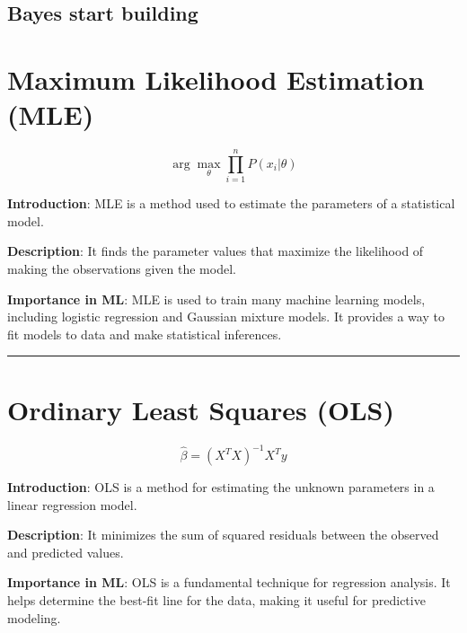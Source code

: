 \documentclass[
  12 pt,
  a4paper,
]{book}
\numberwithin{equation}{section}
\theoremstyle{plain}      %
\theoremstyle{definition} %
\theoremstyle{remark}     %
\theoremstyle{note}         %
\begin{document}
\hypertarget{bayes-start-building}{%
\section{Bayes start building}\label{bayes-start-building}}


\hypertarget{maximum-likelihood-estimation-mle}{%
\chapter{Maximum Likelihood Estimation
(MLE)}\label{maximum-likelihood-estimation-mle}}

\[
\arg\max_{\theta} \prod_{i=1}^n P(x_i | \theta)
\]

\textbf{Introduction}: MLE is a method used to estimate the parameters
of a statistical model.

\textbf{Description}: It finds the parameter values that maximize the
likelihood of making the observations given the model.

\textbf{Importance in ML}: MLE is used to train many machine learning
models, including logistic regression and Gaussian mixture models. It
provides a way to fit models to data and make statistical inferences.

\begin{center}\rule{0.5\linewidth}{0.5pt}\end{center}

\newpage

\hypertarget{ordinary-least-squares-ols}{%
\chapter{Ordinary Least Squares
(OLS)}\label{ordinary-least-squares-ols}}

\[
\hat{\beta} = (X^T X)^{-1} X^T y
\]

\textbf{Introduction}: OLS is a method for estimating the unknown
parameters in a linear regression model.

\textbf{Description}: It minimizes the sum of squared residuals between
the observed and predicted values.

\textbf{Importance in ML}: OLS is a fundamental technique for regression
analysis. It helps determine the best-fit line for the data, making it
useful for predictive modeling.
\end{document}
